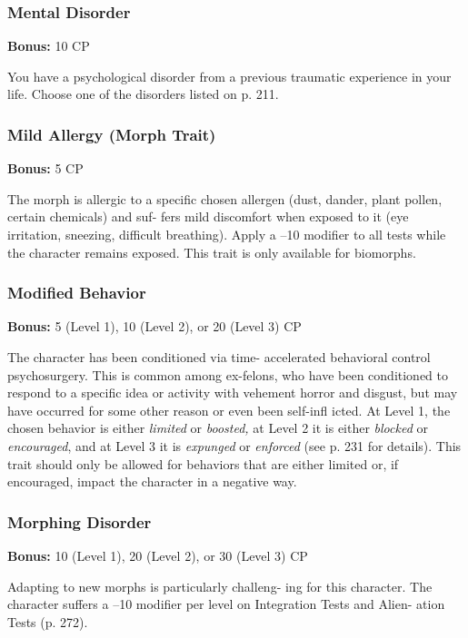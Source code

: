 \subsubsection{Mental Disorder}

\textbf{Bonus:} 10 CP

You have a psychological disorder from a previous 
traumatic experience in your life. Choose one of the 
disorders listed on p. 211.

\subsubsection{Mild Allergy (Morph Trait)}

\textbf{Bonus:} 5 CP

The morph is allergic to a specific chosen allergen 
(dust, dander, plant pollen, certain chemicals) and suf-
fers mild discomfort when exposed to it (eye irritation, 
sneezing, difficult breathing). Apply a –10 modifier to 
all tests while the character remains exposed. This 
trait is only available for biomorphs.

\subsubsection{Modified Behavior}

\textbf{Bonus: }5 (Level 1), 10 (Level 2), or 20 (Level 3) CP

The character has been conditioned via time-
accelerated behavioral control psychosurgery. This is 
common among ex-felons, who have been conditioned 
to respond to a specific idea or activity with vehement 
horror and disgust, but may have occurred for some 
other reason or even been self-infl icted. At Level 1, the 
chosen behavior is either \textit{limited} or \textit{boosted,} at Level 
2 it is either \textit{blocked }or \textit{encouraged}, and at Level 3 it 
is \textit{expunged }or \textit{enforced }(see p. 231 for details). This 
trait should only be allowed for behaviors that are 
either limited or, if encouraged, impact the character 
in a negative way.

\subsubsection{Morphing Disorder}

\textbf{Bonus:} 10 (Level 1), 20 (Level 2), or 30 (Level 3) CP

Adapting to new morphs is particularly challeng-
ing for this character. The character suffers a –10 
modifier per level on Integration Tests and Alien-
ation Tests (p. 272).

